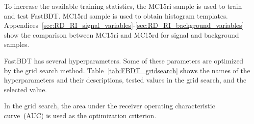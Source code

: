 To increase the available training statistics, the MC15ri sample is used to train and test FastBDT. MC15rd sample is used to obtain histogram templates. 
Appendices~\ref{sec:RD_RI_signal_variables}-\ref{sec:RD_RI_background_variables} show the comparison between MC15ri and MC15rd for signal and background samples.

FastBDT has several hyperparameters.
Some of these parameters are optimized by the grid search method.
Table~\ref{tab:FBDT_gridsearch} shows the names of the hyperparameters and their descriptions, tested values in the grid search, and the selected value.
\begin{table}
\caption{Name of hyperparameters, descriptions, and their values.}
  \renewcommand{\arraystretch}{1.2}
  \centering

  \label{tab:FBDT_gridsearch}
\end{table}
In the grid search, the area under the receiver operating characteristic curve~(AUC) is used as the optimization criterion.
